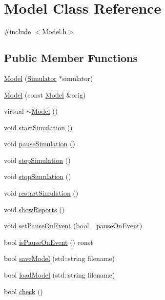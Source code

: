 \hypertarget{class_model}{\section{Model Class Reference}
\label{class_model}
}


{\ttfamily \#include $<$Model.\-h$>$}

\subsection*{Public Member Functions}
\begin{DoxyCompactItemize}
\item 
\hyperlink{class_model_ae86e1403523e8036ba6366d1967ecac0}{Model} (\hyperlink{class_simulator}{Simulator} $\ast$simulator)
\item 
\hyperlink{class_model_afdedf278781f785abeecf5f450e43653}{Model} (const \hyperlink{class_model}{Model} \&orig)
\item 
virtual \hyperlink{class_model_ad6ebd2062a0b823db841a0b88baac4c0}{$\sim$\-Model} ()
\item 
void \hyperlink{class_model_a6fd6613a5141552a6493eb3a840cde24}{start\-Simulation} ()
\item 
void \hyperlink{class_model_ab10d4bdc433d11bf4bb7117675091d8c}{pause\-Simulation} ()
\item 
void \hyperlink{class_model_a025b6ab3112a1df6f7773389b096302c}{step\-Simulation} ()
\item 
void \hyperlink{class_model_a6452e846a5e560220236b7a59f1dd84b}{stop\-Simulation} ()
\item 
void \hyperlink{class_model_a8be70da19c6c315269acc5a3fd2e3b7d}{restart\-Simulation} ()
\item 
void \hyperlink{class_model_a44c66f552308e7a6a5701801186a8637}{show\-Reports} ()
\item 
void \hyperlink{class_model_a99238439363a292fe1fc503eb2157a55}{set\-Pause\-On\-Event} (bool \-\_\-pause\-On\-Event)
\item 
bool \hyperlink{class_model_a1dda07db7bddff456907067eeeb5c21a}{is\-Pause\-On\-Event} () const 
\item 
bool \hyperlink{class_model_ae099910781f5267a51fb5d607246af4a}{save\-Model} (std\-::string filename)
\item 
bool \hyperlink{class_model_aba57e8b62d4dcc3ac8e3037933fa6f04}{load\-Model} (std\-::string filename)
\item 
bool \hyperlink{class_model_a01c9bc6de757ca0662267e3c92a6973a}{check} ()

\end{DoxyCompactItemize}
